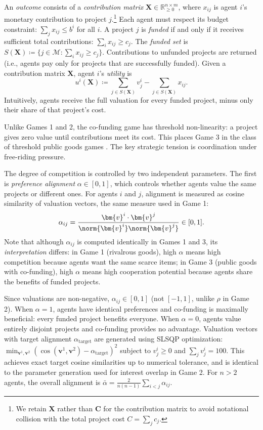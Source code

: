 An \emph{outcome} consists of a \emph{contribution matrix} $\bm{X} \in \mathbb{R}_{\geq 0}^{n \times m}$, where $x_{ij}$ is agent $i$'s monetary contribution to project $j$.\footnote{We retain $\bm{X}$ rather than $\bm{C}$ for the contribution matrix to avoid notational collision with the total project cost $C = \sum_j c_j$.}
Each agent must respect its budget constraint: $\sum_{j} x_{ij} \leq b^i$ for all $i$.
A project $j$ is \emph{funded} if and only if it receives sufficient total contributions: $\sum_{i} x_{ij} \geq c_j$.
The \emph{funded set} is $S(\bm{X}) \coloneqq \{j \in \mathcal{M} : \sum_{i} x_{ij} \geq c_j\}$.
Contributions to unfunded projects are returned (i.e., agents pay only for projects that are successfully funded).
Given a contribution matrix $\bm{X}$, agent $i$'s \emph{utility} is
\begin{equation}
    u^i(\bm{X}) \coloneqq \sum_{j \in S(\bm{X})} v^{i}_{j} - \sum_{j \in S(\bm{X})} x_{ij}.
\end{equation}
Intuitively, agents receive the full valuation for every funded project, minus only their share of that project's cost.

Unlike Games 1 and 2, the co-funding game has threshold non-linearity: a project gives zero value until contributions meet its cost.
This places Game 3 in the class of threshold public goods games \citep{palfrey1984testing}.
The key strategic tension is coordination under free-riding pressure.

The degree of competition is controlled by two independent parameters.
The first is \emph{preference alignment} $\alpha \in [0,1]$, which controls whether agents value the same projects or different ones.
For agents $i$ and $j$, alignment is measured as cosine similarity of valuation vectors, the same measure used in Game 1:
\begin{equation}
    \alpha_{ij} = \frac{\bm{v}^{i} \cdot \bm{v}^{j}}{\norm{\bm{v}^{i}} \norm{\bm{v}^{j}}} \in [0,1].
\end{equation}
Note that although $\alpha_{ij}$ is computed identically in Games 1 and 3, its \emph{interpretation} differs: in Game 1 (rivalrous goods), high $\alpha$ means high competition because agents want the same scarce items; in Game 3 (public goods with co-funding), high $\alpha$ means high cooperation potential because agents share the benefits of funded projects.

Since valuations are non-negative, $\alpha_{ij} \in [0,1]$ (not $[-1,1]$, unlike $\rho$ in Game 2).
When $\alpha = 1$, agents have identical preferences and co-funding is maximally beneficial: every funded project benefits everyone.
When $\alpha = 0$, agents value entirely disjoint projects and co-funding provides no advantage.
Valuation vectors with target alignment $\alpha_{\text{target}}$ are generated using SLSQP optimization: $\min_{\bm{v}^1, \bm{v}^2} (\cos(\bm{v}^1, \bm{v}^2) - \alpha_{\text{target}})^2$ subject to $v^i_j \geq 0$ and $\sum_j v^i_j = 100$.
This achieves exact target cosine similarities up to numerical tolerance, and is identical to the parameter generation used for interest overlap in Game 2.
For $n > 2$ agents, the overall alignment is $\bar{\alpha} = \frac{2}{n(n-1)} \sum_{i < j} \alpha_{ij}$.

